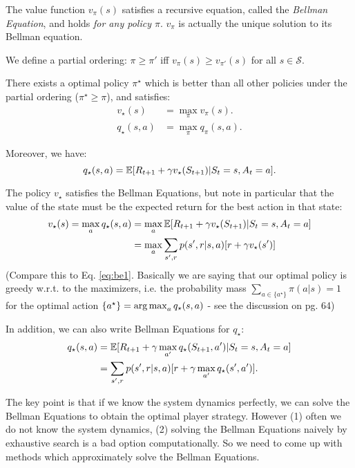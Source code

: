 \documentclass{article}
\begin{document}
The value function $v_\pi(s)$ satisfies a recursive equation, called the \emph{Bellman Equation}, and holds \emph{for any policy $\pi$}. $v_\pi$ is actually the unique solution to its Bellman equation.

\begin{definition}
We define a partial ordering: $\pi \ge \pi'$ iff $v_\pi(s) \ge v_{\pi'}(s)$ for all $s\in \mathcal{S}$.
\end{definition}

\begin{claim}
There exists a optimal policy $\pi^\star$ which is better than all other policies under the partial ordering ($\pi^\star \ge \pi$), and satisfies:
\begin{align}
    v_\star(s) &= \max_\pi v_\pi(s). \\
    q_\star(s,a) &= \max_\pi q_\pi(s,a).
\end{align}

Moreover, we have:
\begin{equation}
    q_\star(s,a) = \operatorname*{\mathbb{E}}[R_{t+1} + \gamma v_\star(S_{t+1})|S_t =s, A_t = a].
\end{equation}
\end{claim}

The policy $v_\star$ satisfies the Bellman Equations, but note in particular that the value of the state must be the expected return for the best action in that state:
\begin{align}
    v_\star(s) = \max_a q_\star(s,a) &= \max_a \operatorname*{\mathbb{E}}[R_{t+1} + \gamma v_\star(S_{t+1})|S_t=s, A_t=a] \\
    &= \max_a \sum_{s',r} p(s',r|s,a) [r+\gamma v_\star(s')] \label{eq:be2}
\end{align}
(Compare this to Eq. \ref{eq:be1}. Basically we are saying that our optimal policy is greedy w.r.t. to the maximizers, i.e. the probability mass $\sum_{a \in \{a^\star\}} \pi(a|s) = 1$ for the optimal action $\{a^\star\}= \operatorname*{arg\,max}_a q_\star(s,a)$ - see the discussion on pg. 64)

In addition, we can also write Bellman Equations for $q_\star$:
\begin{align}
    q_\star(s,a) &= \operatorname*{\mathbb{E}}[R_{t+1} + \gamma \max_{a'} q_\star(S_{t+1},a')|S_t=s, A_t=a]\\
    &= \sum_{s',r} p(s',r|s,a) [r+\gamma \max_{a'} q_\star(s',a')].
\end{align}

The key point is that if we know the system dynamics perfectly, we can solve the Bellman Equations to obtain the optimal player strategy. However (1) often we do not know the system dynamics, (2) solving the Bellman Equations naively by exhaustive search is a bad option computationally. So we need to come up with methods which approximately solve the Bellman Equations.
\end{document}
